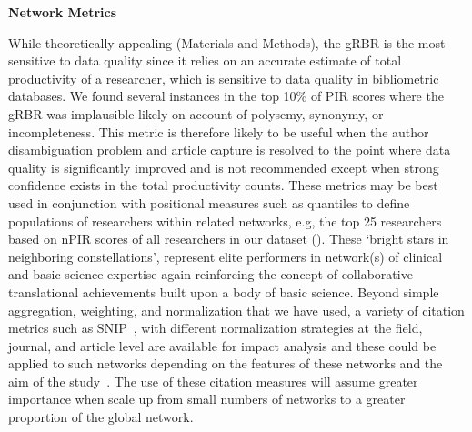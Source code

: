 \documentclass[10pt,letterpaper]{article}
\begin{document}
\textbf{Network Metrics}   

While theoretically appealing (Materials and Methods), the gRBR is the most sensitive to data quality since it relies on an accurate estimate of total productivity of a researcher, which is sensitive to data quality in bibliometric databases. We found several instances in the top 10\% of PIR scores where the gRBR was implausible likely on account of polysemy, synonymy, or incompleteness. This metric is therefore likely to be useful when the author disambiguation problem and article capture is resolved to the point where data quality is significantly improved and is not recommended except when strong confidence exists in the total productivity counts. These metrics may be best used in conjunction with positional measures such as quantiles to define populations of researchers within related networks, e.g, the top 25 researchers based on nPIR scores of all researchers in our dataset (). These `bright stars in neighboring constellations', represent elite performers in network(s) of clinical and basic science expertise again reinforcing the concept of collaborative translational achievements built upon a body of basic science. Beyond simple aggregation, weighting, and normalization that we have used, a variety of citation metrics such as SNIP~\cite{bibWaltman}, with different normalization strategies at the field, journal, and article level are available for impact analysis and these could be applied to such networks depending on the features of these networks and the aim of the study~\cite{bibIoannidis}. The use of these citation measures will assume greater importance when scale up from small numbers of networks to a greater proportion of the global network.
\end{document}
